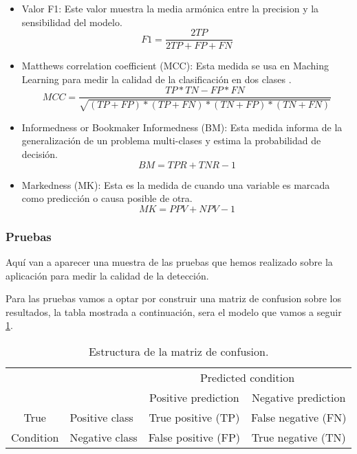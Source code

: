 \begin{itemize}
\item Valor F1: Este valor muestra la media armónica entre la precision y la sensibilidad del modelo.
\[F1=\frac{2TP}{2TP+FP+FN}\]

\item Matthews correlation coefficient (MCC):
Esta medida se usa en Maching Learning para medir la calidad de la clasificación en dos clases \cite{wiki:machineMCC}.
 \[MCC=\frac{TP*TN-FP*FN}{\sqrt{(TP+FP)*(TP+FN)*(TN+FP)*(TN+FN)}}\]
 
\item Informedness or Bookmaker Informedness (BM):
Esta medida informa de la generalización de un problema multi-clases y estima la probabilidad de decisión.
 \[BM=TPR+TNR-1\]

\item Markedness (MK):
Esta es la medida de cuando una variable es marcada como predicción o causa posible de otra.
 \[MK=PPV+NPV-1\]


\end{itemize}



\subsubsection{Pruebas}
Aquí van a aparecer una muestra de las pruebas que hemos realizado sobre la aplicación para medir la calidad de la detección.


Para las pruebas vamos a optar por construir una matriz de confusion sobre los resultados, la tabla mostrada a continuación, sera el modelo que vamos a seguir \ref{tab:ConfMatrix}.

\begin{table}
  \begin{center}
    \begin{tabular}{c l c c}
                 &                & \multicolumn{2}{c}{\cellcolor{brown!25}Predicted condition}   \\
                 &                & \cellcolor{brown!15}Positive prediction & \cellcolor{brown!45}Negative prediction \\
       \cellcolor{blue!15}True      & \cellcolor{blue!10}Positive class & \cellcolor{green!25}True positive (TP)  & \cellcolor{red!25}False negative (FN) \\
       \cellcolor{blue!15}Condition & \cellcolor{blue!30}Negative class & \cellcolor{red!25}False positive (FP) & \cellcolor{green!25}True negative (TN)  \\
    \end{tabular}
  \end{center}
  \caption{Estructura de la matriz de confusion.}
  \label{tab:ConfMatrix}
\end{table}



